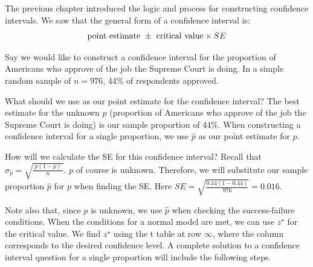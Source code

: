 

The previous chapter introduced the logic and process for constructing confidence intervals.  We saw that the general form of a confidence interval is:
\begin{align*}
\text{point estimate}\ \pm\ \text{critical value} \times SE\vspace{-2mm}
\end{align*}

Say we would like to construct a confidence interval for the proportion of Americans who approve of the job the Supreme Court is doing. In a simple random sample of $n = 976$, 44\% of respondents approved. 

\begin{example}{What should we use as our point estimate for the confidence interval?}
The best estimate for the unknown $p$ (proportion of Americans who approve of the job the Supreme Court is doing) is our sample proportion of 44\%.  When constructing a confidence interval for a single proportion, we use $\hat{p}$ as our point estimate for $p$.
\end{example}

\begin{example}{How will we calculate the SE for this confidence interval?} 
Recall that $\sigma_{\hat{p}} = \sqrt{\frac{\ p(1-p)\ }{n}}$.  $p$ of course is unknown.  Therefore, we will substitute our sample proportion $\hat{p}$ for $p$ when finding the SE.  Here $SE = \sqrt{\frac{0.44(1-0.44)}{976}}= 0.016$.
\end{example}

Note also that, since $p$ is unknown, we use $\hat{p}$ when checking the success-failure conditions.  When the conditions for a normal model are met, we can use $z^\star$ for the critical value.  We find $z^\star$ using the t table at row $\infty$, where the column corresponds to the desired confidence level.  A complete solution to a confidence interval question for a single proportion will include the following steps.  

%
%

